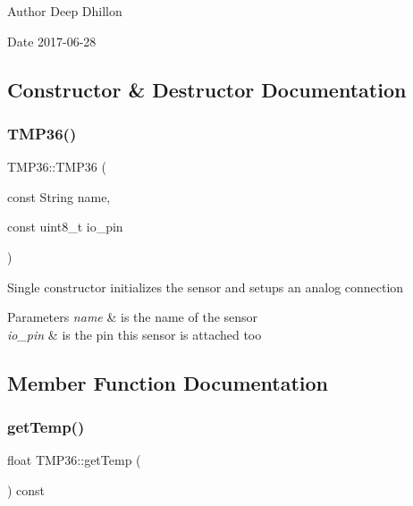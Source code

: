 \begin{DoxyAuthor}{Author}
Deep Dhillon 
\end{DoxyAuthor}
\begin{DoxyDate}{Date}
2017-\/06-\/28 
\end{DoxyDate}


\subsection{Constructor \& Destructor Documentation}
\mbox{\label{class_t_m_p36_a8973c298cb40084aed715a404423a214}} 
\subsubsection{\texorpdfstring{T\+M\+P36()}{TMP36()}}
{\footnotesize\ttfamily T\+M\+P36\+::\+T\+M\+P36 (\begin{DoxyParamCaption}\item[{const String}]{name,  }\item[{const uint8\+\_\+t}]{io\+\_\+pin }\end{DoxyParamCaption})}

Single constructor initializes the sensor and setups an analog connection 
\begin{DoxyParams}{Parameters}
{\em name} & is the name of the sensor \\
\hline
{\em io\+\_\+pin} & is the pin this sensor is attached too \\
\hline
\end{DoxyParams}


\subsection{Member Function Documentation}
\mbox{\label{class_t_m_p36_aeb884c6c65eb7fdaff09af9adbbb919c}} 
\subsubsection{\texorpdfstring{get\+Temp()}{getTemp()}}
{\footnotesize\ttfamily float T\+M\+P36\+::get\+Temp (\begin{DoxyParamCaption}{ }\end{DoxyParamCaption}) const}

